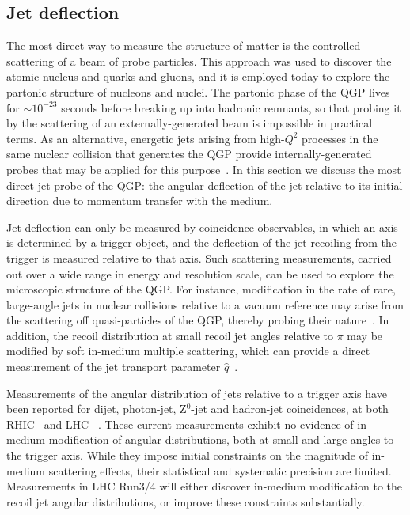 \subsection{Jet deflection}
The most direct way to measure the structure of matter is the controlled scattering of a beam of probe particles. This approach was used to discover the atomic nucleus and quarks and gluons, and it is employed today to explore the partonic structure of nucleons and nuclei. The partonic phase of the QGP lives for $\sim10^{-23}$ seconds before breaking up into hadronic remnants, so that probing it by the scattering of an externally-generated beam is impossible in practical terms. 
As an alternative, energetic jets arising from high-$Q^2$ processes in the same nuclear collision that generates the QGP provide internally-generated probes that may be applied for this purpose~\cite{Bjorken:1982tu,Gyulassy:1990ye,Baier:1994bd,Zakharov:2018rst,Gyulassy:1999zd,Wiedemann:2009sh}. 
In this section we discuss the most direct jet probe of the QGP: the angular deflection of the jet relative to its initial direction due to momentum transfer with the medium. 

Jet deflection can only be measured by coincidence observables, in which an axis is determined by a trigger object, and the deflection of the jet recoiling from the trigger is measured relative to that axis. Such scattering measurements, carried out over a wide range in energy and resolution scale, can be used to explore the microscopic structure of the QGP. For instance, modification in the rate of rare, large-angle jets in nuclear collisions relative to a vacuum reference may arise from the scattering off quasi-particles of the QGP, thereby probing their nature~\cite{DEramo:2012uzl}. In addition, the recoil distribution at small recoil jet angles relative to $\pi$ may be modified by soft in-medium multiple scattering, which can provide a direct measurement of the jet transport parameter $\hat{q}$~\cite{Chen:2016vem}.

Measurements of the angular distribution of jets relative to a trigger axis have been reported for dijet, photon-jet, Z$^{0}$-jet and hadron-jet coincidences, at both RHIC~\cite{Adamczyk:2017yhe} and LHC ~\cite{Adam:2015doa,Sirunyan:2017jic,Sirunyan:2017qhf,Chatrchyan:2012nia,Aaboud:2017eww}. These current measurements exhibit no evidence of in-medium modification of angular distributions, both at small and large angles to the trigger axis. While they impose initial constraints on the magnitude of in-medium scattering effects, their statistical and systematic precision are limited. Measurements in LHC Run3/4 will either discover in-medium modification to the recoil jet angular distributions, or improve these constraints substantially.

